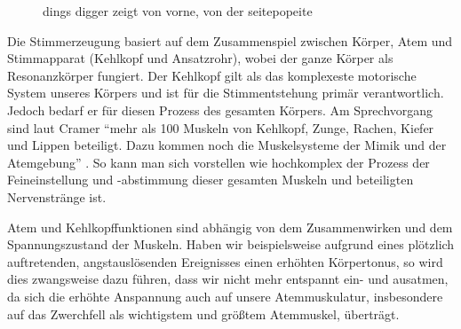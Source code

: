 \begin{figure}
  \centering
  \hfill
  \caption[]{dings digger  zeigt von vorne,   von der seitepopeite}
  \label{fig:kehlkopf}
\end{figure}

Die Stimmerzeugung basiert auf dem Zusammenspiel zwischen Körper, Atem und Stimmapparat (Kehlkopf und Ansatzrohr), wobei der ganze Körper als Resonanzkörper fungiert. Der Kehlkopf gilt als das komplexeste motorische System unseres Körpers und ist für die Stimmentstehung primär verantwortlich. Jedoch bedarf er für diesen Prozess des gesamten Körpers. Am Sprechvorgang sind laut Cramer "`mehr als 100 Muskeln von Kehlkopf, Zunge, Rachen, Kiefer und Lippen beteiligt. Dazu kommen noch die Muskelsysteme der Mimik und der Atemgebung"' \autocite[40]{cramer1998}. So kann man sich vorstellen wie hochkomplex der Prozess der Feineinstellung und -abstimmung dieser gesamten Muskeln und beteiligten Nervenstränge ist. 

Atem und Kehlkopffunktionen sind abhängig von dem Zusammenwirken und dem Spannungszustand der Muskeln. Haben wir beispielsweise aufgrund eines plötzlich auftretenden, angstauslösenden Ereignisses einen erhöhten Körpertonus, so wird dies zwangsweise dazu führen, dass wir nicht mehr entspannt ein- und ausatmen, da sich die erhöhte Anspannung auch auf unsere Atemmuskulatur, insbesondere auf das Zwerchfell als wichtigstem und größtem Atemmuskel, überträgt. 

